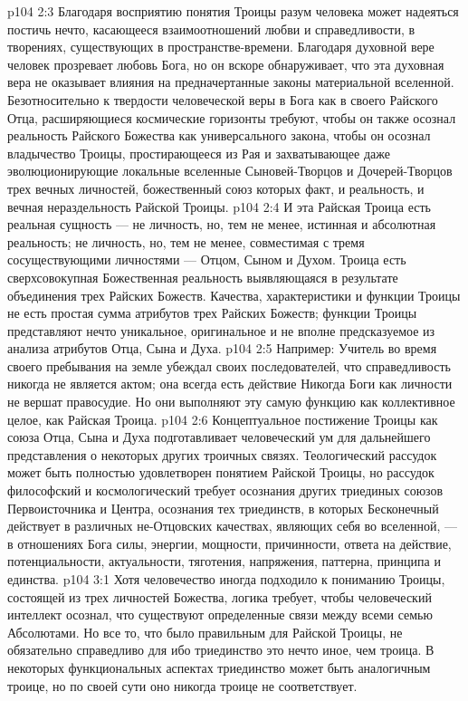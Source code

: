 \vs p104 2:3 Благодаря восприятию понятия Троицы разум человека может надеяться постичь нечто, касающееся взаимоотношений любви и справедливости, в творениях, существующих в пространстве\hyp{}времени. Благодаря духовной вере человек прозревает любовь Бога, но он вскоре обнаруживает, что эта духовная вера не оказывает влияния на предначертанные законы материальной вселенной. Безотносительно к твердости человеческой веры в Бога как в своего Райского Отца, расширяющиеся космические горизонты требуют, чтобы он также осознал реальность Райского Божества как универсального закона, чтобы он осознал владычество Троицы, простирающееся из Рая и захватывающее даже эволюционирующие локальные вселенные Сыновей\hyp{}Творцов и Дочерей\hyp{}Творцов трех вечных личностей, божественный союз которых  факт, и реальность, и вечная нераздельность Райской Троицы.
\vs p104 2:4 И эта Райская Троица есть реальная сущность --- не личность, но, тем не менее, истинная и абсолютная реальность; не личность, но, тем не менее, совместимая с тремя сосуществующими личностями --- Отцом, Сыном и Духом. Троица есть сверхсовокупная Божественная реальность выявляющаяся в результате объединения трех Райских Божеств. Качества, характеристики и функции Троицы не есть простая сумма атрибутов трех Райских Божеств; функции Троицы представляют нечто уникальное, оригинальное и не вполне предсказуемое из анализа атрибутов Отца, Сына и Духа.
\vs p104 2:5 Например: Учитель во время своего пребывания на земле убеждал своих последователей, что справедливость никогда не является  актом; она всегда есть действие  Никогда Боги как личности не вершат правосудие. Но они выполняют эту самую функцию как коллективное целое, как Райская Троица.
\vs p104 2:6 Концептуальное постижение Троицы как союза Отца, Сына и Духа подготавливает человеческий ум для дальнейшего представления о некоторых других троичных связях. Теологический рассудок может быть полностью удовлетворен понятием Райской Троицы, но рассудок философский и космологический требует осознания других триединых союзов Первоисточника и Центра, осознания тех триединств, в которых Бесконечный действует в различных не\hyp{}Отцовских качествах, являющих себя во вселенной, --- в отношениях Бога силы, энергии, мощности, причинности, ответа на действие, потенциальности, актуальности, тяготения, напряжения, паттерна, принципа и единства.
\vs p104 3:1 Хотя человечество иногда подходило к пониманию Троицы, состоящей из трех личностей Божества, логика требует, чтобы человеческий интеллект осознал, что существуют определенные связи между всеми семью Абсолютами. Но все то, что было правильным для Райской Троицы, не обязательно справедливо для  ибо триединство это нечто иное, чем троица. В некоторых функциональных аспектах триединство может быть аналогичным троице, но по своей сути оно никогда троице не соответствует.
